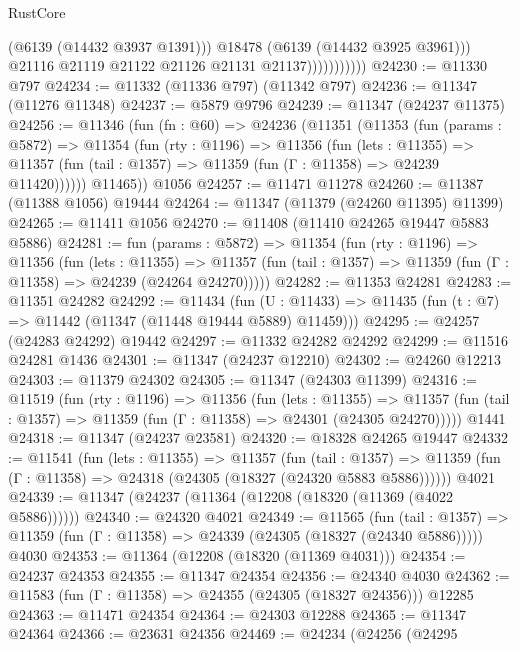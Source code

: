 \begin{lexlean}{RustCore}
\begin{coremodule}
                              (@6139 (@14432 @3937 @1391)))
                            @18478
                            (@6139 (@14432 @3925 @3961)))
                          @21116
                          @21119
                          @21122
                          @21126
                          @21131
                          @21137)))))))))))
@24230 := @11330 @797
@24234 := @11332 (@11336 @797) (@11342 @797)
@24236 := @11347 (@11276 @11348)
@24237 := @5879 @9796
@24239 := @11347 (@24237 @11375)
@24256 := @11346
    (fun (fn : @60) =>
    @24236
      (@11351
        (@11353
          (fun (params : @5872) =>
          @11354
            (fun (rty : @1196) =>
            @11356
              (fun (lets : @11355) =>
              @11357 (fun (tail : @1357) => @11359 (fun (Γ : @11358) => @24239 @11420))))))
        @11465))
    @1056
@24257 := @11471 @11278
@24260 := @11387 (@11388 @1056) @19444
@24264 := @11347 (@11379 (@24260 @11395) @11399)
@24265 := @11411 @1056
@24270 := @11408 (@11410 @24265 @19447 @5883 @5886)
@24281 := fun (params : @5872) =>
  @11354
    (fun (rty : @1196) =>
    @11356
      (fun (lets : @11355) =>
      @11357 (fun (tail : @1357) => @11359 (fun (Γ : @11358) => @24239 (@24264 @24270)))))
@24282 := @11353 @24281
@24283 := @11351 @24282
@24292 := @11434
    (fun (U : @11433) => @11435 (fun (t : @7) => @11442 (@11347 (@11448 @19444 @5889) @11459)))
@24295 := @24257 (@24283 @24292) @19442
@24297 := @11332 @24282 @24292
@24299 := @11516 @24281 @1436
@24301 := @11347 (@24237 @12210)
@24302 := @24260 @12213
@24303 := @11379 @24302
@24305 := @11347 (@24303 @11399)
@24316 := @11519
    (fun (rty : @1196) =>
    @11356
      (fun (lets : @11355) =>
      @11357 (fun (tail : @1357) => @11359 (fun (Γ : @11358) => @24301 (@24305 @24270)))))
    @1441
@24318 := @11347 (@24237 @23581)
@24320 := @18328 @24265 @19447
@24332 := @11541
    (fun (lets : @11355) =>
    @11357
      (fun (tail : @1357) =>
      @11359 (fun (Γ : @11358) => @24318 (@24305 (@18327 (@24320 @5883 @5886))))))
    @4021
@24339 := @11347 (@24237 (@11364 (@12208 (@18320 (@11369 (@4022 @5886))))))
@24340 := @24320 @4021
@24349 := @11565
    (fun (tail : @1357) => @11359 (fun (Γ : @11358) => @24339 (@24305 (@18327 (@24340 @5886)))))
    @4030
@24353 := @11364 (@12208 (@18320 (@11369 @4031)))
@24354 := @24237 @24353
@24355 := @11347 @24354
@24356 := @24340 @4030
@24362 := @11583 (fun (Γ : @11358) => @24355 (@24305 (@18327 @24356))) @12285
@24363 := @11471 @24354
@24364 := @24303 @12288
@24365 := @11347 @24364
@24366 := @23631 @24356
@24469 := @24234
    (@24256
      (@24295

\end{coremodule}
\end{lexlean}
